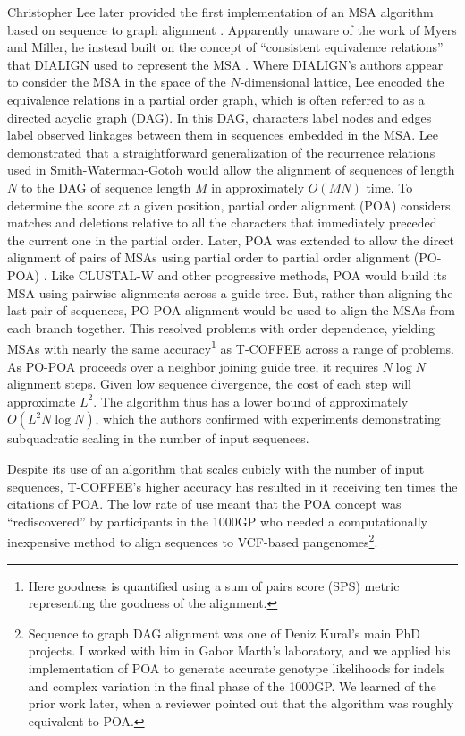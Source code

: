 Christopher Lee later provided the first implementation of an MSA algorithm based on sequence to graph alignment \cite{lee2002POA}.
Apparently unaware of the work of Myers and Miller, he instead built on the concept of ``consistent equivalence relations'' that DIALIGN used to represent the MSA \cite{morgenstern1996multiple}.
Where DIALIGN's authors appear to consider the MSA in the space of the $N$-dimensional lattice, Lee encoded the equivalence relations in a partial order graph, which is often referred to as a directed acyclic graph (DAG).
In this DAG, characters label nodes and edges label observed linkages between them in sequences embedded in the MSA.
Lee demonstrated that a straightforward generalization of the recurrence relations used in Smith-Waterman-Gotoh would allow the alignment of sequences of length $N$ to the DAG of sequence length $M$ in approximately $O(MN)$ time.
To determine the score at a given position, partial order alignment (POA) considers matches and deletions relative to all the characters that immediately preceded the current one in the partial order.
Later, POA was extended to allow the direct alignment of pairs of MSAs using partial order to partial order alignment (PO-POA) \cite{grasso2004combining}.
Like CLUSTAL-W and other progressive methods, POA would build its MSA using pairwise alignments across a guide tree.
But, rather than aligning the last pair of sequences, PO-POA alignment would be used to align the MSAs from each branch together.
This resolved problems with order dependence, yielding MSAs with nearly the same accuracy\footnote{Here goodness is quantified using a sum of pairs score (SPS) metric representing the goodness of the alignment.} as T-COFFEE across a range of problems.
As PO-POA proceeds over a neighbor joining guide tree, it requires $N \log{N}$ alignment steps.
Given low sequence divergence, the cost of each step will approximate $L^2$.
The algorithm thus has a lower bound of approximately $O(L^{2}N\log{N})$, which the authors confirmed with experiments demonstrating subquadratic scaling in the number of input sequences.

Despite its use of an algorithm that scales cubicly with the number of input sequences, T-COFFEE's higher accuracy has resulted in it receiving ten times the citations of POA.
The low rate of use meant that the POA concept was ``rediscovered'' by participants in the 1000GP who
needed a computationally inexpensive method to align sequences to VCF-based pangenomes\footnote{Sequence to graph DAG alignment was one of Deniz Kural's main PhD projects. I worked with him in Gabor Marth's laboratory, and we applied his implementation of POA to generate accurate genotype likelihoods for indels and complex variation in the final phase of the 1000GP. We learned of the prior work later, when a reviewer pointed out that the algorithm was roughly equivalent to POA.}.

